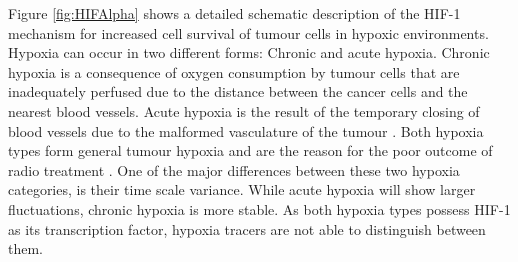 Figure \ref{fig:HIFAlpha} shows a detailed schematic description of the HIF-1 mechanism for increased cell survival of tumour cells in hypoxic environments. Hypoxia can occur in two different forms: Chronic and acute hypoxia. Chronic hypoxia is a consequence of oxygen consumption by tumour cells that are inadequately perfused due to the distance between the cancer cells and the nearest blood vessels. Acute hypoxia is the result of the temporary closing of blood vessels due to the malformed vasculature of the tumour \cite{Simon}. Both hypoxia types form general tumour hypoxia and are the reason for the poor outcome of radio treatment \cite{pmid14516104}. One of the major differences between these two hypoxia categories, is their time scale variance. While acute hypoxia will show larger fluctuations, chronic hypoxia is more stable. As both hypoxia types possess HIF-1 as its transcription factor, hypoxia tracers are not able to distinguish between them.
